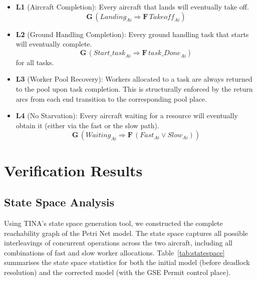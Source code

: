 \documentclass[conference]{IEEEtran}
\begin{document}
\begin{itemize}
  \item \textbf{L1} (Aircraft Completion): Every aircraft that lands will
    eventually take off.
    \[
      \mathbf{G}\,(\mathit{Landing}_{Ai} \Rightarrow \mathbf{F}\,\mathit{Takeoff}_{Ai})
    \]

  \item \textbf{L2} (Ground Handling Completion): Every ground handling task
    that starts will eventually complete.
    \[
      \mathbf{G}\,(\mathit{Start\_task}_{Ai} \Rightarrow \mathbf{F}\,\mathit{task\_Done}_{Ai})
    \]
    for all tasks.

  \item \textbf{L3} (Worker Pool Recovery): Workers allocated to a task are
    always returned to the pool upon task completion. This is structurally
    enforced by the return arcs from each end transition to the corresponding
    pool place.

  \item \textbf{L4} (No Starvation): Every aircraft waiting for a resource will
    eventually obtain it (either via the fast or the slow path).
    \[
      \mathbf{G}\,(\mathit{Waiting}_{Ai} \Rightarrow
        \mathbf{F}\,(\mathit{Fast}_{Ai} \vee \mathit{Slow}_{Ai}))
    \]
\end{itemize}


\section{Verification Results}

\subsection{State Space Analysis}

Using TINA's state space generation tool, we constructed the complete
reachability graph of the Petri Net model. The state space captures all possible
interleavings of concurrent operations across the two aircraft, including all
combinations of fast and slow worker allocations. Table~\ref{tab:statespace}
summarises the state space statistics for both the initial model (before deadlock
resolution) and the corrected model (with the GSE Permit control place).
\end{document}
